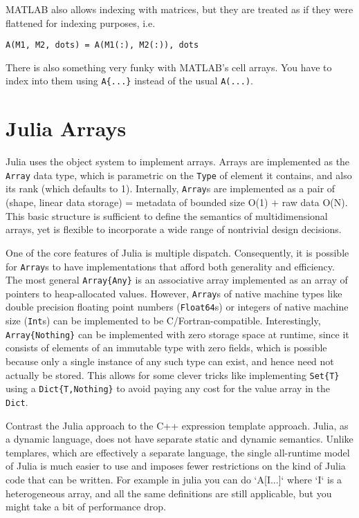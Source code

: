 \documentclass[preprint]{sigplanconf}
\newcommand{\MATLAB}{\textsc{MATLAB}}
\newcommand{\code}[1]{\texttt{#1}}
\begin{document}
\MATLAB{} also allows indexing with matrices, but they are treated as if they
were flattened for indexing purposes, i.e.
\begin{verbatim}
A(M1, M2, dots) = A(M1(:), M2(:)), dots
\end{verbatim}

There is also something very funky with \MATLAB's cell arrays. You have to
index into them using \texttt{A\{...\}} instead of the usual \texttt{A(...)}.



\section{Julia Arrays}

Julia uses the object system to implement arrays. Arrays are implemented as
the \code{Array} data type, which is parametric on the \code{Type} of element
it contains, and also its rank (which defaults to 1). Internally,
\code{Array}s are implemented as a pair of (shape, linear data storage) =
metadata of bounded size O(1) + raw data O(N). This basic structure is
sufficient to define the semantics of multidimensional arrays, yet is flexible
to incorporate a wide range of nontrivial design decisions.

One of the core features of Julia is multiple dispatch. Consequently, it is
possible for \code{Array}s to have implementations that afford both generality
and efficiency. The most general \code{Array\{Any\}} is an associative array
implemented as an array of pointers to heap-allocated values. However,
\code{Array}s of native machine types like double precision floating point
numbers (\code{Float64}s) or integers of native machine size (\code{Int}s) can
be implemented to be C/Fortran-compatible. Interestingly,
\code{Array\{Nothing\}} can be implemented with zero storage space at runtime,
since it consists of elements of an immutable type with zero fields, which is
possible because only a single instance of any such type can exist, and hence
need not actually be stored. This allows for some clever tricks like
implementing \code{Set\{T\}} using a \code{Dict\{T,Nothing\}} to avoid paying
any cost for the value array in the \code{Dict}.

Contrast the Julia approach to the C++ expression template approach. Julia, as a dynamic language, does not have separate static and dynamic semantics. Unlike templares, which are effectively a separate language, the single all-runtime model of Julia is much easier to use and imposes fewer restrictions on the kind of Julia code that can be written. For example in julia you can do `A[I...]`
where `I` is a heterogeneous array, and all the same definitions are
still applicable, but you might take a bit of performance drop.
\end{document}
